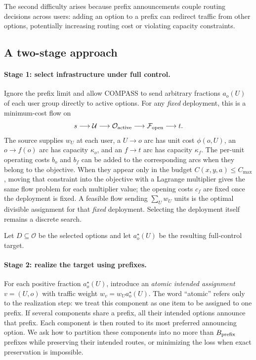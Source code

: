 \documentclass[10pt,a4paper]{article}
\newcommand{\U}{\mathcal U}
\newcommand{\F}{\mathcal F}
\newcommand{\Oset}{\mathcal O}
\begin{document}
The second difficulty arises because prefix announcements couple routing decisions across users: adding an option to a prefix can redirect traffic from other options, potentially increasing routing cost or violating capacity constraints.

\subsection{A two-stage approach}
\label{sec:two-stage}

\paragraph{Stage 1: select infrastructure under full control.}
Ignore the prefix limit and allow COMPASS to send arbitrary fractions $a_o(U)$ of each user group directly to active options. For any \emph{fixed} deployment, this is a minimum-cost flow on
\[
s\longrightarrow\U\longrightarrow\Oset_{\rm active}
\longrightarrow\F_{\rm open}\longrightarrow t.
\]
The source supplies $w_U$ at each user, a $U\to o$ arc has unit cost $\phi(o,U)$, an $o\to f(o)$ arc has capacity $\kappa_o$, and an $f\to t$ arc has capacity $\kappa_f$. The per-unit operating costs $b_o$ and $b_f$ can be added to the corresponding arcs when they belong to the objective. When they appear only in the budget $C(x,y,a)\le C_{\max}$, moving that constraint into the objective with a Lagrange multiplier gives the same flow problem for each multiplier value; the opening costs $c_f$ are fixed once the deployment is fixed. A feasible flow sending $\sum_U w_U$ units is the optimal divisible assignment for that \emph{fixed} deployment. Selecting the deployment itself remains a discrete search.

Let $D\subseteq\Oset$ be the selected options and let $a^\star_o(U)$ be the resulting full-control target.

\paragraph{Stage 2: realize the target using prefixes.}
For each positive fraction $a^\star_o(U)$, introduce an \emph{atomic intended assignment} $v=(U,o)$ with traffic weight $w_v=w_Ua^\star_o(U)$. The word ``atomic'' refers only to the realization step: we treat this component as one item to be assigned to one prefix. If several components share a prefix, all their intended options announce that prefix. Each component is then routed to its most preferred announcing option. We ask how to partition these components into no more than $B_{\rm prefix}$ prefixes while preserving their intended routes, or minimizing the loss when exact preservation is impossible.
\end{document}
